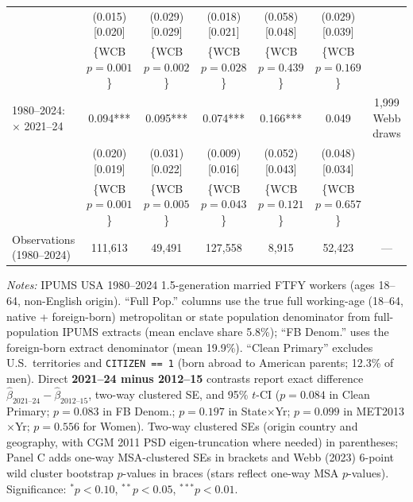 \begin{table}[t!]
{\begin{tabular}{lccccccc}
 & (0.015) [0.020] & (0.029) [0.029] & (0.018) [0.021] & (0.058) [0.048] & (0.029) [0.039] & \multicolumn{2}{c}{} \\
 & \{WCB $p=0.001$\} & \{WCB $p=0.002$\} & \{WCB $p=0.028$\} & \{WCB $p=0.439$\} & \{WCB $p=0.169$\} & \multicolumn{2}{c}{} \\
1980--2024: $\times$ 2021--24 & 0.094*** & 0.095*** & 0.074*** & 0.166*** & 0.049 & \multicolumn{2}{c}{1,999 Webb draws} \\
 & (0.020) [0.019] & (0.031) [0.022] & (0.009) [0.016] & (0.052) [0.043] & (0.048) [0.034] & \multicolumn{2}{c}{} \\
 & \{WCB $p=0.001$\} & \{WCB $p=0.005$\} & \{WCB $p=0.043$\} & \{WCB $p=0.121$\} & \{WCB $p=0.657$\} & \multicolumn{2}{c}{} \\
Observations (1980--2024) & 111,613 & 49,491 & 127,558 & 8,915 & 52,423 & \multicolumn{2}{c}{---} \\
\bottomrule
\end{tabular}%
}
\begin{minipage}{0.98\textwidth}\vspace{2pt}\scriptsize
\textit{Notes:} IPUMS USA 1980--2024 1.5-generation married FTFY workers (ages 18--64, non-English origin). ``Full Pop.'' columns use the true full working-age (18--64, native + foreign-born) metropolitan or state population denominator from full-population IPUMS extracts (mean enclave share 5.8\%); ``FB Denom.'' uses the foreign-born extract denominator (mean 19.9\%). ``Clean Primary'' excludes U.S.\ territories and \texttt{CITIZEN == 1} (born abroad to American parents; 12.3\% of men). Direct \textbf{2021--24 minus 2012--15} contrasts report exact difference $\hat{\beta}_{2021\text{--}24}-\hat{\beta}_{2012\text{--}15}$, two-way clustered SE, and 95\% $t$-CI ($p = 0.084$ in Clean Primary; $p = 0.083$ in FB Denom.; $p = 0.197$ in State$\times$Yr; $p = 0.099$ in MET2013$\times$Yr; $p = 0.556$ for Women). Two-way clustered SEs (origin country and geography, with CGM 2011 PSD eigen-truncation where needed) in parentheses; Panel C adds one-way MSA-clustered SEs in brackets and Webb (2023) 6-point wild cluster bootstrap $p$-values in braces (stars reflect one-way MSA $p$-values). Significance: $^{*} p<0.10$, $^{**} p<0.05$, $^{***} p<0.01$.
\end{minipage}
\end{table}